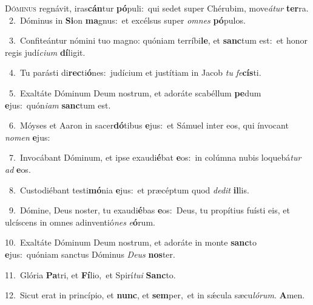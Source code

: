 \lettrine{\initial\textcolor{\initialcolor}{D}}{óminus} regnávit, iras\-\textbf{cán}\-tur \textbf{pó}\-puli:~\star qui sedet super Chérubim, move\-\textit{á}\-\textit{tur} \textbf{ter}\-ra.\\
{\numbfont\textcolor{\numbcolor}{~2.}}~Dóminus in \textbf{Si}\-on \textbf{ma}\-gnus:~\star et excélsus super \textit{om}\-\textit{nes} \textbf{pó}\-pulos.\par
{\numbfont\textcolor{\numbcolor}{~3.}}~Confiteántur nómini tuo magno: quóniam terríbi\-\textbf{le}\-, et \textbf{sanc}\-tum est:~\star et honor regis judí\-\textit{ci}\-\textit{um} \textbf{dí}\-ligit.\par
{\numbfont\textcolor{\numbcolor}{~4.}}~Tu parásti di\-\textbf{rec}\-ti\-\textbf{ó}\-nes:~\star judícium et justítiam in Jacob \textit{tu} \textit{fe}\-\textbf{cís}ti.\par
{\numbfont\textcolor{\numbcolor}{~5.}}~Exaltáte Dóminum Deum nostrum, et adoráte scabéllum \textbf{pe}\-dum \textbf{e}\-jus:~\star quón\-\textit{i}\-\textit{am} \textbf{sanc}\-tum est.\par
{\numbfont\textcolor{\numbcolor}{~6.}}~Móyses et Aaron in sacer\-\textbf{dó}\-tibus \textbf{e}\-jus:~\star et Sámuel inter eos, qui ínvocant \textit{no}\-\textit{men} \textbf{e}\-jus:\par
{\numbfont\textcolor{\numbcolor}{~7.}}~Invocábant Dóminum, et ipse exaudi\-\textbf{é}\-bat \textbf{e}\-os:~\star in colúmna nubis loquebá\textit{tur} \textit{ad} \textbf{e}\-os.\par
{\numbfont\textcolor{\numbcolor}{~8.}}~Custodiébant testi\-\textbf{mó}\-nia \textbf{e}\-jus:~\star et præcéptum quod \textit{de}\-\textit{dit} \textbf{il}\-lis.\par
{\numbfont\textcolor{\numbcolor}{~9.}}~Dómine, Deus noster, tu exaudi\-\textbf{é}\-bas \textbf{e}\-os:~\star Deus, tu propítius fuísti eis, et ulcíscens in omnes adinventió\textit{nes} \textit{e}\-\textbf{ó}rum.\par
{\numbfont\textcolor{\numbcolor}{10.}}~Exaltáte Dóminum Deum nostrum, et adoráte in monte \textbf{sanc}\-to \textbf{e}\-jus:~\star quóniam sanctus Dóminus \textit{De}\-\textit{us} \textbf{nos}\-ter.\par
{\numbfont\textcolor{\numbcolor}{11.}}~Glória \textbf{Pa}\-tri, et \textbf{Fí}\-lio,~\star et Spirí\-\textit{tu}\-\textit{i} \textbf{Sanc}\-to.\par
{\numbfont\textcolor{\numbcolor}{12.}}~Sicut erat in princípio, et \textbf{nunc}\-, et \textbf{sem}\-per,~\star et in sǽcula sæcu\-\textit{ló}\-\textit{rum}. \textbf{A}\-men.\par
